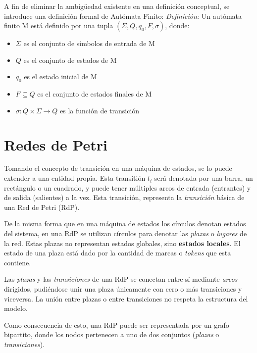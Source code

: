 A fin de eliminar la ambigüedad existente en una definición conceptual, se
introduce una definición formal de Autómata Finito:
\newline\newline\emph{Definición:} Un autómata finito M está definido por una
tupla $(\Sigma, Q, q_{0}, F, \sigma)$, donde:
\begin{itemize}    
  \item $\Sigma$ es el conjunto de símbolos de entrada de M
  \item $Q$ es el conjunto de estados de M
  \item $q_{0}$ es el estado inicial de M
  \item $F \subseteq Q$ es el conjunto de estados finales de M
  \item $\sigma : Q  \times \Sigma \rightarrow Q$ es la función de
  transición
\end{itemize} \cite{FSM_Wright}

\section{Redes de Petri}
\label{redes_de_petri}

Tomando el concepto de transición en una máquina de estados, se lo puede
extender a una entidad propia.
Esta transitión $t_{i}$ será denotada por una barra, un rectángulo o un
cuadrado, y puede tener múltiples arcos de entrada (entrantes) y de salida
(salientes) a la vez. Esta transición, representa la \textit{transición} básica
de una Red de Petri (RdP).\cite{PetriNetsFundamentals}

De la misma forma que en una máquina de estados los círculos denotan estados
del sistema, en una RdP se utilizan círculos para denotar las \textit{plazas} o
\textit{lugares} de la red. Estas plazas no representan estados globales, sino
\textbf{estados locales}. \cite{PetriNetsFundamentals} El estado de una plaza
está dado por la cantidad de marcas o \textit{tokens} que esta contiene.

Las \textit{plazas} y las \textit{transiciones} de una RdP se conectan entre sí
mediante \textit{arcos} dirigidos, pudiéndose unir una plaza únicamente con cero
o más transiciones y viceversa. La unión entre plazas o entre transiciones no
respeta la estructura del modelo.

Como consecuencia de esto, una RdP puede ser representada por un grafo
bipartito, donde los nodos pertenecen a uno de dos conjuntos (\textit{plazas} o
\textit{transiciones}).

